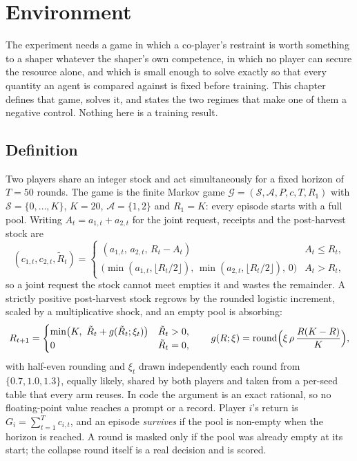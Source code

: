 \chapter{Environment}
\label{ch:env}


The experiment needs a game in which a co-player's restraint is worth
something to a shaper whatever the shaper's own competence, in which no
player can secure the resource alone, and which is small enough to solve
exactly so that every quantity an agent is compared against is fixed before
training.
This chapter defines that game, solves it, and states the two regimes that
make one of them a negative control.
Nothing here is a training result.

\section{Definition}
\label{sec:env-def}

Two players share an integer stock and act simultaneously for a fixed
horizon of \(T=50\) rounds.
The game is the finite Markov game
\(\mathcal{G}=(\mathcal{S},\mathcal{A},P,c,T,R_1)\) with
\(\mathcal{S}=\{0,\dots,K\}\), \(K=20\), \(\mathcal{A}=\{1,2\}\) and
\(R_1=K\): every episode starts with a full pool.
Writing \(A_t=a_{1,t}+a_{2,t}\) for the joint request, receipts and the
post-harvest stock are
\begin{equation}
  (c_{1,t},c_{2,t},\tilde{R}_t)=
  \begin{cases}
    (a_{1,t},\,a_{2,t},\,R_t-A_t) & A_t\le R_t,\\[2pt]
    \bigl(\min(a_{1,t},\lfloor R_t/2\rfloor),\,
          \min(a_{2,t},\lfloor R_t/2\rfloor),\,0\bigr) & A_t>R_t,
  \end{cases}
  \label{eq:dial-harvest}
\end{equation}
so a joint request the stock cannot meet empties it and wastes the
remainder.
A strictly positive post-harvest stock regrows by the rounded logistic
increment, scaled by a multiplicative shock, and an empty pool is absorbing:
\begin{equation}
  R_{t+1}=
  \begin{cases}
    \min\bigl(K,\ \tilde{R}_t+g(\tilde{R}_t;\xi_t)\bigr) & \tilde{R}_t>0,\\
    0 & \tilde{R}_t=0,
  \end{cases}
  \qquad
  g(R;\xi)=\operatorname{round}\Bigl(\xi\,\rho\,\frac{R(K-R)}{K}\Bigr),
  \label{eq:dial-growth}
\end{equation}
with half-even rounding and \(\xi_t\) drawn independently each round from
\(\{0.7,1.0,1.3\}\), equally likely, shared by both players and taken from a
per-seed table that every arm reuses.
In code the argument is an exact rational, so no floating-point value
reaches a prompt or a record.
Player \(i\)'s return is \(G_i=\sum_{t=1}^{T}c_{i,t}\), and an episode
\emph{survives} if the pool is non-empty when the horizon is reached.
A round is masked only if the pool was already empty at its start; the
collapse round itself is a real decision and is scored.

